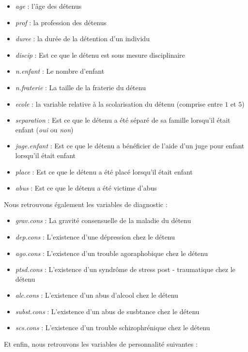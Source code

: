 \begin{itemize}
\item \textit{age} : l'âge des détenus 
\item \textit{prof} : la profession des détenus  
\item \textit{duree} : la durée de la détention d'un individu  
\item \textit{discip} : Est ce que le détenu est sous mesure disciplinaire  
\item \textit{n.enfant} : Le nombre d'enfant
\item \textit{n.fraterie} : La taille de la fraterie du détenu 
\item \textit{ecole} : la variable relative à la scolarisation du détenu (comprise entre $1$ et $5$) 
\item \textit{separation} : Est ce que le détenu a été séparé de sa famille lorsqu'il était enfant (\textit{oui} ou \textit{non})
\item \textit{juge.enfant} : Est ce que le détenu a bénéficier de l'aide d'un juge pour enfant lorsqu'il était enfant  
\item \textit{place} : Est ce que le détenu a été placé lorsqu'il était enfant 
\item \textit{abus} : Est ce que le détenu a été victime d'abus 
\end{itemize}
Nous retrouvons également les variables de diagnostic :
\begin{itemize}
\item \textit{grav.cons} : La gravité consensuelle de la maladie du détenu
\item \textit{dep.cons} : L'existence d'une dépression chez le détenu  
\item \textit{ago.cons} : L'existence d'un trouble agoraphobique chez le détenu  
\item \textit{ptsd.cons} : L'existence d'un syndrôme de stress post - traumatique chez le détenu 
\item \textit{alc.cons} : L'existence d'un abus d'alcool chez le détenu 
\item \textit{subst.cons} : L'existence d'un abus de susbtance chez le détenu 
\item \textit{scs.cons} : L'existence d'un trouble schizophrénique chez le détenu  
\end{itemize}
Et enfin, nous retrouvons les variables de personnalité suivantes : 
